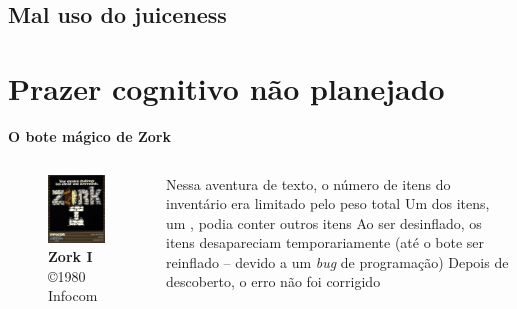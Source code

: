 \expandafter\documentclass\expandafter[table, usenames, svgnames, dvipsnames, \classopts]{beamer}
\begin{document}
\subsection{Mal uso do juiceness}




\section{Prazer cognitivo não planejado}

\begin{frame}{\textbf{O bote mágico de Zork}}

\begin{columns}[c]  
\begin{figure}
\centering
\includegraphics[draft,height=0.5\paperheight]{zork}
\caption{\tiny \textbf{Zork I} \copyright{1980} Infocom\footnotemark{}}
\end{figure}
\begin{outline}
\1 Nessa aventura de texto, o número de itens do inventário era limitado pelo peso total
\1 Um dos itens, um \textit{}, podia conter outros itens
\1 Ao ser desinflado, os itens desapareciam temporariamente (até o bote ser reinflado -- devido a um \textit{bug} de programação)
\1 Depois de descoberto, o erro não foi corrigido
\end{outline}

\end{columns}
\end{frame}
\end{document}
